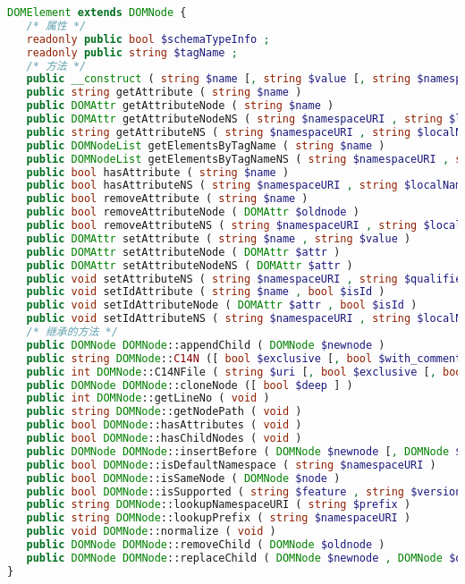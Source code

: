 \begin{lstlisting}[language=PHP]
DOMElement extends DOMNode {
   /* 属性 */
   readonly public bool $schemaTypeInfo ;
   readonly public string $tagName ;
   /* 方法 */
   public __construct ( string $name [, string $value [, string $namespaceURI ]] )
   public string getAttribute ( string $name )
   public DOMAttr getAttributeNode ( string $name )
   public DOMAttr getAttributeNodeNS ( string $namespaceURI , string $localName )
   public string getAttributeNS ( string $namespaceURI , string $localName )
   public DOMNodeList getElementsByTagName ( string $name )
   public DOMNodeList getElementsByTagNameNS ( string $namespaceURI , string $localName )
   public bool hasAttribute ( string $name )
   public bool hasAttributeNS ( string $namespaceURI , string $localName )
   public bool removeAttribute ( string $name )
   public bool removeAttributeNode ( DOMAttr $oldnode )
   public bool removeAttributeNS ( string $namespaceURI , string $localName )
   public DOMAttr setAttribute ( string $name , string $value )
   public DOMAttr setAttributeNode ( DOMAttr $attr )
   public DOMAttr setAttributeNodeNS ( DOMAttr $attr )
   public void setAttributeNS ( string $namespaceURI , string $qualifiedName , string $value )
   public void setIdAttribute ( string $name , bool $isId )
   public void setIdAttributeNode ( DOMAttr $attr , bool $isId )
   public void setIdAttributeNS ( string $namespaceURI , string $localName , bool $isId )
   /* 继承的方法 */
   public DOMNode DOMNode::appendChild ( DOMNode $newnode )
   public string DOMNode::C14N ([ bool $exclusive [, bool $with_comments [, array $xpath [, array $ns_prefixes ]]]] )
   public int DOMNode::C14NFile ( string $uri [, bool $exclusive [, bool $with_comments [, array $xpath [, array $ns_prefixes ]]]] )
   public DOMNode DOMNode::cloneNode ([ bool $deep ] )
   public int DOMNode::getLineNo ( void )
   public string DOMNode::getNodePath ( void )
   public bool DOMNode::hasAttributes ( void )
   public bool DOMNode::hasChildNodes ( void )
   public DOMNode DOMNode::insertBefore ( DOMNode $newnode [, DOMNode $refnode ] )
   public bool DOMNode::isDefaultNamespace ( string $namespaceURI )
   public bool DOMNode::isSameNode ( DOMNode $node )
   public bool DOMNode::isSupported ( string $feature , string $version )
   public string DOMNode::lookupNamespaceURI ( string $prefix )
   public string DOMNode::lookupPrefix ( string $namespaceURI )
   public void DOMNode::normalize ( void )
   public DOMNode DOMNode::removeChild ( DOMNode $oldnode )
   public DOMNode DOMNode::replaceChild ( DOMNode $newnode , DOMNode $oldnode )
}
\end{lstlisting}

